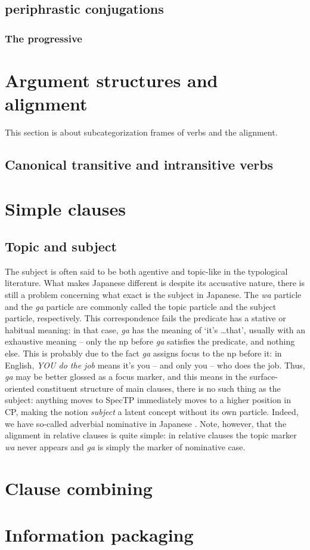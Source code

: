 \documentclass[UTF8, a4paper, oneside, scheme=plain]{ctexart}
\newcommand*{\citesec}[1]{\S~{#1}}
\newcommand*{\term}[1]{\emph{#1}}
\newcommand{\corpus}[1]{\emph{#1}}
\newcommand{\translate}[1]{`#1'}
\begin{document}
\subsection{periphrastic conjugations}

\subsubsection{The progressive}

\section{Argument structures and alignment}\label{sec:arguments}

This section is about subcategorization frames of verbs and the alignment.

\subsection{Canonical transitive and intransitive verbs}

\section{Simple clauses}

\subsection{Topic and subject}\label{sec:topic-subject}

The subject is often said to be both agentive and topic-like in the typological literature.
What makes Japanese different is despite its accusative nature,
there is still a problem concerning what exact is the subject in Japanese.
The \corpus{wa} particle and the \corpus{ga} particle are commonly called 
the topic particle and the subject particle, respectively.
This correspondence fails the predicate has a stative or habitual meaning:
in that case, \corpus{ga} has the meaning of \translate{it's \dots that},
usually with an exhaustive meaning -- 
only the \ac{np} before \corpus{ga} satisfies the predicate,
and nothing else.
This is probably due to the fact \corpus{ga} assigns focus to the \ac{np} before it:
in English, \corpus{YOU do the job} means it's you -- and only you -- who does the job.
Thus, \corpus{ga} may be better glossed as a focus marker,
and this means in the surface-oriented constituent structure of main clauses, 
there is no such thing as the subject: 
anything moves to SpecTP immediately moves to a higher position in CP, 
making the notion \term{subject} a latent concept without its own particle.
Indeed, we have so-called adverbial nominative in Japanese \citet[\citesec{6.1}]{endo2007locality}.
Note, however, that the alignment in relative clauses is quite simple:
in relative clauses the topic marker \corpus{wa} never appears 
and \corpus{ga} is simply the marker of nominative case.

\section{Clause combining}

\section{Information packaging}




\end{document}
